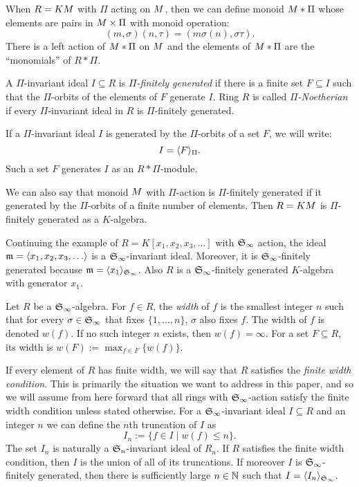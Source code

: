 When $R = KM$ with $\Pi$ acting on $M$, then we can define monoid $M *\Pi$ whose elements are pairs in $M \times \Pi$ with monoid operation:
 \[ (m, \sigma)(n, \tau) = (m\sigma(n), \sigma\tau). \]
There is a left action of $M*\Pi$ on $M$ and the elements of $M *\Pi$ are the ``monomials'' of $R*\Pi$.

\begin{definition}
 A $\Pi$-invariant ideal $I \subseteq R$ is {\em $\Pi$-finitely generated} if there is a finite set $F \subseteq I$ such that the $\Pi$-orbits of the elements of $F$ generate $I$.  Ring $R$ is called {\em $\Pi$-Noetherian} if every $\Pi$-invariant ideal in $R$ is $\Pi$-finitely generated.
\end{definition}
If a $\Pi$-invariant ideal $I$ is generated by the $\Pi$-orbits of a set $F$, we will write:
 \[ I = \langle F \rangle_{\Pi}. \]
Such a set $F$ generates $I$ as an $R*\Pi$-module.

We can also say that monoid $M$ with $\Pi$-action is $\Pi$-finitely generated if it generated by the $\Pi$-orbits of a finite number of elements.  Then $R = KM$ is $\Pi$-finitely generated as a $K$-algebra.

\begin{example}
Continuing the example of $R = K[x_1,x_2,x_3,\ldots]$ with $\mathfrak S_\infty$ action, the ideal $\mathfrak m = \langle x_1,x_2,x_3,\ldots \rangle$ is a $\mathfrak S_\infty$-invariant ideal.  Moreover, it is $\mathfrak S_\infty$-finitely generated because $\mathfrak m = \langle x_1 \rangle_{\mathfrak S_\infty}$.  Also $R$ is a $\mathfrak S_\infty$-finitely generated $K$-algebra with generator $x_1$.
\end{example}
 

\begin{definition}
 Let $R$ be a $\mathfrak S_\infty$-algebra.  For $f \in R$, the {\em width} of $f$ is the smallest integer $n$ such that for every $\sigma \in \mathfrak S_\infty$ that fixes $\{1,\ldots,n\}$, $\sigma$ also fixes $f$.  The width of $f$ is denoted $w(f)$.  If no such integer $n$ exists, then $w(f) = \infty$.  For a set $F \subseteq R$, its width is $w(F) := \max_{f \in F}\{w(f)\}$.
\end{definition}
If every element of $R$ has finite width, we will say that $R$ satisfies the {\em finite width condition}.  This is primarily the situation we want to address in this paper, and so we will assume from here forward that all rings with $\mathfrak S_\infty$-action satisfy the finite width condition unless stated otherwise.  For a $\mathfrak S_\infty$-invariant ideal $I \subseteq R$ and an integer $n$ we can define the $n$th truncation of $I$ as
 \[ I_n := \{ f \in I \mid w(f) \leq n \}. \]
The set $I_n$ is naturally a $\mathfrak S_n$-invariant ideal of $R_n$.  If $R$ satisfies the finite width condition, then $I$ is the union of all of its truncations.  If moreover $I$ is $\mathfrak S_\infty$-finitely generated, then there is sufficiently large $n \in \mathbb N$ such that $I = \langle I_n \rangle_{\mathfrak S_\infty}$.

